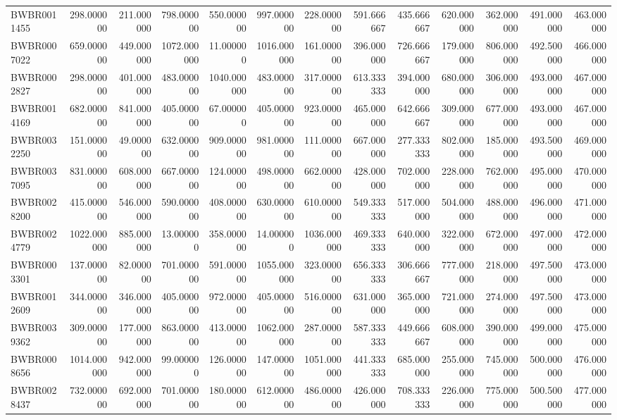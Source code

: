 \begin{longtable}{lrrrrrrrrrrrr}
BWBR0011455 & 298.000000 & 211.000000 & 798.000000 & 550.000000 & 997.000000 & 228.000000 & 591.666667 & 435.666667 & 620.000000 & 362.000000 & 491.000000 & 463.000000 \\
BWBR0007022 & 659.000000 & 449.000000 & 1072.000000 & 11.000000 & 1016.000000 & 161.000000 & 396.000000 & 726.666667 & 179.000000 & 806.000000 & 492.500000 & 466.000000 \\
BWBR0002827 & 298.000000 & 401.000000 & 483.000000 & 1040.000000 & 483.000000 & 317.000000 & 613.333333 & 394.000000 & 680.000000 & 306.000000 & 493.000000 & 467.000000 \\
BWBR0014169 & 682.000000 & 841.000000 & 405.000000 & 67.000000 & 405.000000 & 923.000000 & 465.000000 & 642.666667 & 309.000000 & 677.000000 & 493.000000 & 467.000000 \\
BWBR0032250 & 151.000000 & 49.000000 & 632.000000 & 909.000000 & 981.000000 & 111.000000 & 667.000000 & 277.333333 & 802.000000 & 185.000000 & 493.500000 & 469.000000 \\
BWBR0037095 & 831.000000 & 608.000000 & 667.000000 & 124.000000 & 498.000000 & 662.000000 & 428.000000 & 702.000000 & 228.000000 & 762.000000 & 495.000000 & 470.000000 \\
BWBR0028200 & 415.000000 & 546.000000 & 590.000000 & 408.000000 & 630.000000 & 610.000000 & 549.333333 & 517.000000 & 504.000000 & 488.000000 & 496.000000 & 471.000000 \\
BWBR0024779 & 1022.000000 & 885.000000 & 13.000000 & 358.000000 & 14.000000 & 1036.000000 & 469.333333 & 640.000000 & 322.000000 & 672.000000 & 497.000000 & 472.000000 \\
BWBR0003301 & 137.000000 & 82.000000 & 701.000000 & 591.000000 & 1055.000000 & 323.000000 & 656.333333 & 306.666667 & 777.000000 & 218.000000 & 497.500000 & 473.000000 \\
BWBR0012609 & 344.000000 & 346.000000 & 405.000000 & 972.000000 & 405.000000 & 516.000000 & 631.000000 & 365.000000 & 721.000000 & 274.000000 & 497.500000 & 473.000000 \\
BWBR0039362 & 309.000000 & 177.000000 & 863.000000 & 413.000000 & 1062.000000 & 287.000000 & 587.333333 & 449.666667 & 608.000000 & 390.000000 & 499.000000 & 475.000000 \\
BWBR0008656 & 1014.000000 & 942.000000 & 99.000000 & 126.000000 & 147.000000 & 1051.000000 & 441.333333 & 685.000000 & 255.000000 & 745.000000 & 500.000000 & 476.000000 \\
BWBR0028437 & 732.000000 & 692.000000 & 701.000000 & 180.000000 & 612.000000 & 486.000000 & 426.000000 & 708.333333 & 226.000000 & 775.000000 & 500.500000 & 477.000000 \\

\end{longtable}
